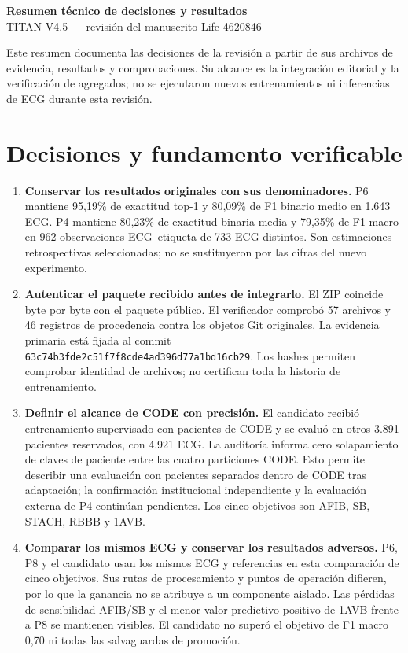 \documentclass[11pt,a4paper]{article}
\begin{document}
\begin{center}
{\Large\bfseries Resumen técnico de decisiones y resultados}\\[4pt]
TITAN V4.5 --- revisión del manuscrito Life 4620846
\end{center}

Este resumen documenta las decisiones de la revisión a partir de sus archivos de evidencia, resultados y comprobaciones. Su alcance es la integración editorial y la verificación de agregados; no se ejecutaron nuevos entrenamientos ni inferencias de ECG durante esta revisión.

\section*{Decisiones y fundamento verificable}
\begin{enumerate}
\item \textbf{Conservar los resultados originales con sus denominadores.}
P6 mantiene 95,19\% de exactitud top-1 y 80,09\% de F1 binario medio en 1.643 ECG. P4 mantiene 80,23\% de exactitud binaria media y 79,35\% de F1 macro en 962 observaciones ECG--etiqueta de 733 ECG distintos. Son estimaciones retrospectivas seleccionadas; no se sustituyeron por las cifras del nuevo experimento.

\item \textbf{Autenticar el paquete recibido antes de integrarlo.}
El ZIP coincide byte por byte con el paquete público. El verificador comprobó 57 archivos y 46 registros de procedencia contra los objetos Git originales. La evidencia primaria está fijada al commit \texttt{63c74b3fde2c51f7f8cd}\allowbreak\texttt{e4ad396d77a1bd16cb29}. Los hashes permiten comprobar identidad de archivos; no certifican toda la historia de entrenamiento.

\item \textbf{Definir el alcance de CODE con precisión.}
El candidato recibió entrenamiento supervisado con pacientes de CODE y se evaluó en otros 3.891 pacientes reservados, con 4.921 ECG. La auditoría informa cero solapamiento de claves de paciente entre las cuatro particiones CODE. Esto permite describir una evaluación con pacientes separados dentro de CODE tras adaptación; la confirmación institucional independiente y la evaluación externa de P4 continúan pendientes. Los cinco objetivos son AFIB, SB, STACH, RBBB y 1AVB.

\item \textbf{Comparar los mismos ECG y conservar los resultados adversos.}
P6, P8 y el candidato usan los mismos ECG y referencias en esta comparación de cinco objetivos. Sus rutas de procesamiento y puntos de operación difieren, por lo que la ganancia no se atribuye a un componente aislado. Las pérdidas de sensibilidad AFIB/SB y el menor valor predictivo positivo de 1AVB frente a P8 se mantienen visibles. El candidato no superó el objetivo de F1 macro 0,70 ni todas las salvaguardas de promoción.
\end{enumerate}
\end{document}
